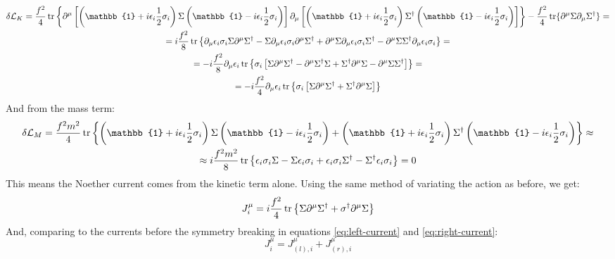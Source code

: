 \documentclass{article}
\begin{document}
\begin{equation}
\begin{gathered}
    \delta \mathcal{L}_K = \frac{f^2}{4}
        \tr\left\{\partial^\mu\left[\left(\mathbb{1} + i\epsilon_i \frac{1}{2}\sigma_i\right)\Sigma\left(\mathbb{1} - i\epsilon_i \frac{1}{2}\sigma_i\right)\right] \partial_\mu\left[\left(\mathbb{1} + i\epsilon_i \frac{1}{2}\sigma_i\right)\Sigma^\dagger\left(\mathbb{1} - i\epsilon_i \frac{1}{2}\sigma_i\right)\right]\right\} - \frac{f^2}{4}\tr\{
            \partial^\mu\Sigma\partial_\mu\Sigma^\dagger
        \}
    = \\ = i \frac{f^2}{8}\tr\left\{
        \partial_\mu \epsilon_i \sigma_i \Sigma \partial^\mu \Sigma^\dagger - \Sigma \partial_\mu \epsilon_i \sigma_i \partial^\mu \Sigma^\dagger + \partial^\mu \Sigma \partial_\mu \epsilon_i \sigma_i \Sigma^\dagger - \partial^\mu \Sigma \Sigma^\dagger \partial_\mu \epsilon_i \sigma_i
    \right\} = \\ = - i \frac{f^2}{8}\partial_\mu \epsilon_i\tr\left\{\sigma_i\left[
        \Sigma \partial^\mu \Sigma^\dagger
        - \partial^\mu \Sigma^\dagger \Sigma
        + \Sigma^\dagger \partial^\mu \Sigma
        - \partial^\mu \Sigma \Sigma^\dagger
    \right]
    \right\} = \\ = - i \frac{f^2}{4}\partial_\mu \epsilon_i\tr\left\{\sigma_i\left[
        \Sigma \partial^\mu \Sigma^\dagger
        + \Sigma^\dagger \partial^\mu \Sigma
    \right]
    \right\}
\end{gathered}
\end{equation}
And from the mass term:
\begin{equation}
\begin{gathered}
    \delta \mathcal{L}_M = \frac{f^2m^2}{4}\tr\left\{
        \left(\mathbb{1} + i\epsilon_i \frac{1}{2}\sigma_i\right)\Sigma\left(\mathbb{1} - i\epsilon_i \frac{1}{2}\sigma_i\right) + \left(\mathbb{1} + i\epsilon_i \frac{1}{2}\sigma_i\right)\Sigma^\dagger\left(\mathbb{1} - i\epsilon_i \frac{1}{2}\sigma_i\right)
    \right\} \approx \\ \approx i\frac{f^2m^2}{8}\tr\left\{
        \epsilon_i \sigma_i \Sigma - \Sigma \epsilon_i \sigma_i +
        \epsilon_i \sigma_i \Sigma^\dagger - \Sigma^\dagger \epsilon_i \sigma_i
    \right\} = 0
\end{gathered}
\end{equation}
This means the Noether current comes from the kinetic term alone. Using the same method of variating the action as before, we get:
\begin{equation}
    J^\mu_i = i\frac{f^2}{4}\tr\left\{\Sigma\partial^\mu\Sigma^\dagger + \sigma^\dagger\partial^\mu\Sigma\right\}
\end{equation}
And, comparing to the currents before the symmetry breaking in equations \ref{eq:left-current} and \ref{eq:right-current}:
\begin{equation}
    J^\mu_i = J^\mu_{(l),i} + J^\mu_{(r),i}
\end{equation}
\end{document}
